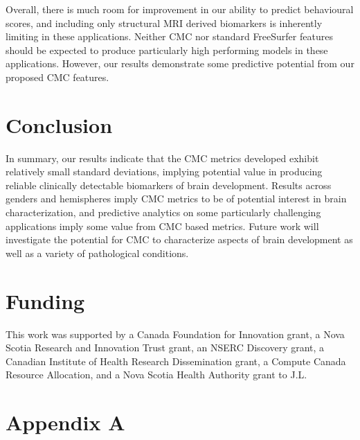 \documentclass{article}
\begin{document}
Overall, there is much room for improvement in our ability to predict
behavioural scores, and including only structural MRI derived biomarkers is
inherently limiting in these applications. Neither CMC nor standard
FreeSurfer features should be expected to produce particularly high performing
models in these applications. However, our results demonstrate some
predictive potential from our proposed CMC features.

\section{Conclusion}

In summary, our results indicate that the CMC metrics developed exhibit
relatively small standard deviations, implying potential value in producing
reliable clinically detectable biomarkers of brain development. Results
across genders and hemispheres imply CMC metrics to be of potential interest
in brain characterization, and predictive analytics on some particularly
challenging applications imply some value from CMC based metrics. Future work
will investigate the potential for CMC to characterize aspects of brain
development as well as a variety of pathological conditions.

\section{Funding}


This work was supported by a Canada Foundation for Innovation grant, a Nova
Scotia Research and Innovation Trust grant, an NSERC Discovery grant, a
Canadian Institute of Health Research Dissemination grant, a Compute Canada
Resource Allocation, and a Nova Scotia Health Authority grant to J.L.


\section{Appendix A}\label{sec:appendix-a}
\end{document}
